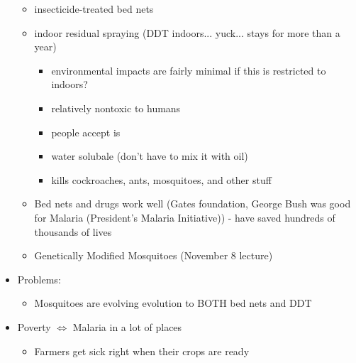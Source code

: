 \documentclass{article}
\begin{document}
\begin{itemize}
\begin{itemize}
            \item insecticide-treated bed nets
            \item indoor residual spraying (DDT indoors... yuck... stays for more than a year)
            \begin{itemize}
                \item environmental impacts are fairly minimal if this is restricted to indoors?
                \item relatively nontoxic to humans
                \item people accept is
                \item water solubale (don't have to mix it with oil)
                \item kills cockroaches, ants, mosquitoes, and other stuff
            \end{itemize}
            \item Bed nets and drugs work well (Gates foundation, George Bush was good for Malaria (President's Malaria Initiative)) - have saved hundreds of thousands of lives
            \item Genetically Modified Mosquitoes (November 8 lecture)
        \end{itemize}
        \item Problems:
        \begin{itemize}
            \item Mosquitoes are evolving evolution to BOTH bed nets and DDT
        \end{itemize}
        \item Poverty $\iff$ Malaria in a lot of places
        \begin{itemize}
            \item Farmers get sick right when their crops are ready
        \end{itemize}
    \end{itemize}
\end{document}
